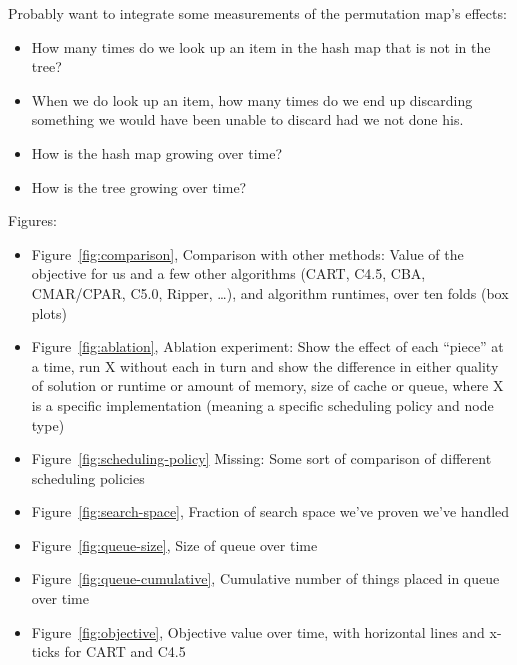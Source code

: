 Probably want to integrate some measurements of the permutation map's effects:
\begin{itemize}
\item How many times do we look up an item in the hash map that is not in the tree?

\item When we do look up an item, how many times do we end up discarding
      something we would have been unable to discard had we not done his.

\item How is the hash map growing over time?

\item How is the tree growing over time?
\end{itemize}

Figures:
\begin{itemize}

\item Figure~\ref{fig:comparison}, Comparison with other methods:
Value of the objective for us and a few other algorithms
(CART, C4.5, CBA, CMAR/CPAR, C5.0, Ripper, \dots), and algorithm runtimes,
over ten folds (box plots)

\item Figure~\ref{fig:ablation},  Ablation experiment:
Show the effect of each ``piece'' at a time,
run X without each in turn and show the difference in either
quality of solution or runtime or amount of memory, size of cache or queue,
where X is a specific implementation
(meaning a specific scheduling policy and node type)

\item Figure~\ref{fig:scheduling-policy}
Missing:  Some sort of comparison of different scheduling policies

\item Figure~\ref{fig:search-space},
Fraction of search space we've proven we've handled

\item Figure~\ref{fig:queue-size}, Size of queue over time

\item Figure~\ref{fig:queue-cumulative},
Cumulative number of things placed in queue over time

\item Figure~\ref{fig:objective}, Objective value over time,
with horizontal lines and x-ticks for CART and C4.5


\end{itemize}
